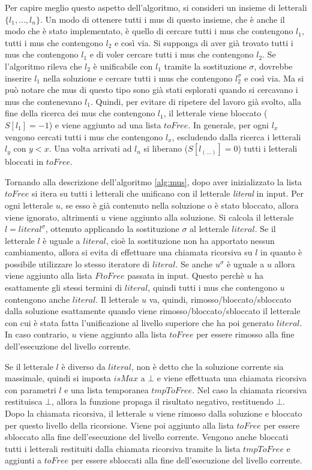 \documentclass[./main.tex]{subfiles}
\begin{document}
Per capire meglio questo aspetto dell'algoritmo, si consideri un insieme di 
letterali $\{l_1, ... , l_n\}$. Un modo di ottenere tutti i mus di questo insieme,
che è anche il modo che è stato implementato,
è quello di cercare tutti i mus che contengono $l_1$, tutti i mus che contengono $l_2$ e così via.
Si supponga di aver già trovato tutti i mus che contengono $l_1$ e di 
voler cercare tutti i mus che contengono $l_2$. 
Se l'algoritmo rileva che $l_2$ è unificabile con $l_1$ tramite la sostituzione $\sigma$,
dovrebbe inserire $l_1$ nella soluzione e cercare tutti i mus
che contengono $l_2^\sigma$ e così via.
Ma si può notare che mus di questo tipo sono già stati esplorati quando 
si cercavano i mus che contenevano $l_1$.
Quindi, per evitare di ripetere del lavoro già svolto,
alla fine della ricerca dei mus che contengono $l_1$, il letterale viene
bloccato ($S[l_1] = -1$) e viene aggiunto ad una lista $toFree$.
In generale, per ogni $l_x$ vengono cercati tutti i mus che contengono $l_x$,
escludendo dalla ricerca i letterali $l_y$ con $y < x$.
Una volta arrivati ad $l_n$ si liberano ($S[l_{(...)}] = 0$) tutti i letterali bloccati in $toFree$.

Tornando alla descrizione dell'algoritmo \ref{alg:mus}, dopo aver inizializzato la lista $toFree$
si itera su tutti i letterali che unificano con il letterale \textit{literal} in input.
Per ogni letterale $u$, se esso è già contenuto nella soluzione o è stato bloccato, allora viene ignorato,
altrimenti $u$ viene aggiunto alla soluzione.
Si calcola il letterale $l = literal^\sigma$, ottenuto applicando la sostituzione
$\sigma$ al letterale $literal$. 
Se il letterale $l$ è uguale a $literal$, cioè la sostituzione non ha 
apportato nessun cambiamento, 
allora si evita di effettuare una chiamata ricorsiva su $l$ in quanto è possibile
utilizzare lo stesso iteratore di $literal$. 
Se anche $u^\sigma$ è uguale a $u$ allora viene aggiunto alla lista $FtoFree$ passata in input.
Questo perchè $u$ ha esattamente gli stessi termini di $literal$, quindi tutti i mus che contengono $u$ contengono anche $literal$.
Il letterale $u$ va, quindi, rimosso/bloccato/sbloccato dalla soluzione esattamente quando viene rimosso/bloccato/sbloccato il letterale
con cui è stata fatta l'unificazione al livello superiore che ha poi generato $literal$.
In caso contrario, $u$ viene aggiunto alla lista $toFree$ per essere rimosso alla fine dell'esecuzione del livello corrente.

Se il letterale $l$ è diverso da $literal$, non è detto che la soluzione corrente sia massimale,
quindi si imposta $isMax$ a $\bot$ e viene effettuata una chiamata ricorsiva con parametri $l$
e una lista temporanea $tmpToFree$. 
Nel caso la chiamata ricorsiva restituisca $\bot$, allora la funzione propaga il risultato negativo, restituendo $\bot$.
Dopo la chiamata ricorsiva, il letterale $u$ viene rimosso dalla soluzione e bloccato per 
questo livello della ricorsione. Viene poi aggiunto alla lista $toFree$ per essere sbloccato 
alla fine dell'esecuzione del livello corrente.
Vengono anche bloccati tutti i letterali restituiti dalla chiamata ricorsiva tramite la lista $tmpToFree$ e aggiunti a $toFree$
per essere sbloccati alla fine dell'esecuzione del livello corrente.
\end{document}
